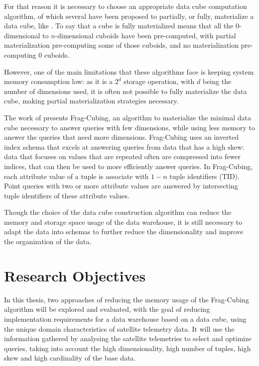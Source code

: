 For that reason it is necessary to choose an appropriate data cube computation algorithm, of which several have been proposed to partially, or fully, materialize a data cube, like \cite{dokaBrownDwarfFullydistributed2011,dongxinCCubingEfficientComputation2006,liSemiClosedCubeEffective2005,liHighdimensionalOLAPMinimal2004,xinComputingIcebergCubes2007}.
To say that a cube is fully materialized means that all the \(0\)-dimensional to \(n\)-dimensional cuboids have been pre-computed, with partial materialization pre-computing some of those cuboids, and no materialization pre-computing $0$ cuboids.

However, one of the main limitations that these algorithms face is keeping system memory consumption low: as it is a $2^d$ storage operation, with $d$ being the number of dimensions used, it is often not possible to fully materialize the data cube, making partial materialization strategies necessary.

The work of \cite{liHighdimensionalOLAPMinimal2004} presents Frag-Cubing, an algorithm to materialize the minimal data cube necessary to answer queries with few dimensions, while using less memory to answer the queries that need more dimensions.
Frag-Cubing uses an inverted index schema that excels at answering queries from data that has a high skew: data that focuses on values that are repeated often are compressed into fewer indices, that can then be used to more efficiently answer queries.
In Frag-Cubing, each attribute value of a tuple is associate with $1-n$ tuple identifiers (TID).
Point queries with two or more attribute values are answered by intersecting tuple identifiers of these attribute values.

Though the choice of the data cube construction algorithm can reduce the memory and storage space usage of the data warehouse, it is still necessary to adapt the data into schemas to further reduce the dimensionality and improve the organization of the data.

\section{Research Objectives}\label{ch:intro:obj}

In this thesis, two approaches of reducing the memory usage of the Frag-Cubing algorithm will be explored and evaluated, with the goal of reducing implementation requirements for a data warehouse based on a data cube, using the unique domain characteristics of satellite telemetry data.
It will use the information gathered by analysing the satellite telemetries to select and optimize queries, taking into account the high dimensionality, high number of tuples, high skew and high cardinality of the base data.

